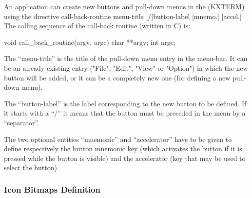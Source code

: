  
 
An application can create new buttons and pull-down menus in the
\EW{} (KXTERM) using the \CDF{} directive
 { call-back-routine menu-title [/]button-label [mnemo.] [accel.]} 
The calling sequence of the call-back routine (written in C) is:
\begin{XMP}
void call_back_routine(argv, argc)
     char **argv;
     int argc;
\end{XMP}

The ``menu-title'' is the title of the pull-down menu entry in the \EW{}
menu-bar. It can be an already existing entry ("File", "Edit", 
"View" or "Option") in which the new button will be added, or it can 
be a completely new one (for defining a new pull-down menu).

The ``button-label'' is the label corresponding to the new button to
be defined. If it starts with a ``/'' it means that the button must
be preceded in the menu by a ``separator''. 

The two optional entities ``mnemonic'' and ``accelerator'' have to be
given to define respectively the button mnemonic key (which activates
the button if it is pressed while the button is visible)  and the accelerator 
(key that may be used to select the button). 

\fi

\subsubsection{Icon Bitmaps Definition}
\label{ref:rebmdef}


